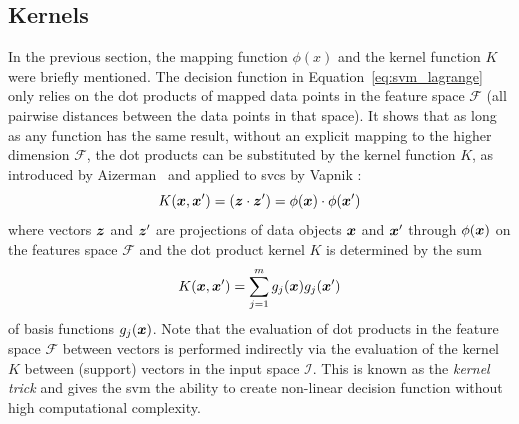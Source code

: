 
\subsection{Kernels}\label{subsec:kernels}
In the previous section, the mapping function $\phi(x)$ and the kernel function $K$ were briefly mentioned.
The decision function in Equation~\ref{eq:svm_lagrange} only relies on the dot products of mapped data points in the feature space $\mathcal{F}$ (\ie all pairwise distances between the data points in that space).
It shows \cite{flach2012machine} that as long as any function has the same result, without an explicit mapping to the higher dimension $\mathcal{F}$, the dot products can be substituted by the kernel function $K$, as introduced by Aizerman~\etal \cite{aizerman1964theoretical} and applied to \glspl{svc} by Vapnik \cite{vapnik1998statistical}:
\begin{equation}
  K(\vectorsym{x}, \vectorsym{x}') = (\vectorsym{z} \cdot \vectorsym{z}') = \phi(\vectorsym{x}) \cdot \phi(\vectorsym{x}')
\end{equation}
where vectors $\vectorsym{z}$ and $\vectorsym{z}'$ are projections of data objects $\vectorsym{x}$ and $\vectorsym{x}'$ through $\phi(\vectorsym{x})$ on the features space $\mathcal{F}$ and the dot product kernel $K$ is determined by the sum
\begin{equation}
  K(\vectorsym{x}, \vectorsym{x}') = \sum_{j=1}^m g_j(\vectorsym{x}) g_j(\vectorsym{x}')
\end{equation}
of basis functions $g_j(\vectorsym{x})$.
Note that the evaluation of dot products in the feature space $\mathcal{F}$ between vectors is performed indirectly via the evaluation of the kernel $K$ between (support) vectors in the input space $\mathcal{I}$.
This is known as the \emph{kernel trick} and gives the \gls{svm} the ability to create non-linear decision function without high computational complexity.

